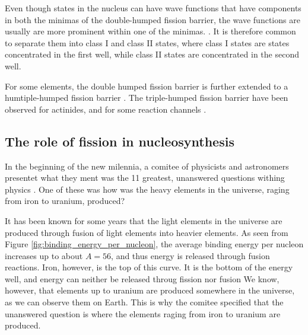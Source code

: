 \documentclass[]{article}
\begin{document}
\noindent Even though states in the nucleus can have wave functions that have components in both the minimas of the double-humped fission barrier, the wave functions are usually are more prominent within one of the minimas. \cite{Wagemas1991}. It is therefore common to separate them into class I and class II states, where class I states are states concentrated in the first well, while class II states are concentrated in the second well. 

For some elements, the double humped fission barrier is further extended to a humtiple-humped fission barrier \cite{Goriely2017}. The triple-humped fission barrier have been observed for actinides, and for some reaction channels \cite{PhysRevC.74.014608}.
 
\subsection{The role of fission in nucleosynthesis}
In the beginning of the new milennia, a comitee of physicists and astronomers presentet what they ment was the 11 greatest, unanswered questions withing physics \cite{Haseltine2002}. One of these was how was the heavy elements in the universe, raging from iron to uranium, produced?

\par 
\vspace{3mm}
It has been known for some years that the light elements in the universe are produced through fusion of light elements into heavier elements. As seen from Figure \ref{fig:binding_energy_per_nucleon}, the average binding energy per nucleon increases up to about $A = 56$, and thus energy is released through fusion reactions. Iron, however, is the top of this curve. It is the bottom of the energy well, and energy can neither be released throug fission nor fusion We know, however, that elements up to uranium are produced somewhere in the universe, as we can observe them on Earth. This is why the comitee specified that the unanswered question is where the elements raging from iron to uranium are produced. 

\par
\vspace{3mm}
\end{document}
